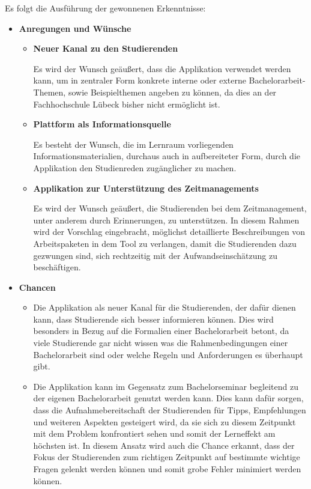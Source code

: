 \documentclass{scrreprt}
\begin{document}
\par Es folgt die Ausführung der gewonnenen Erkenntnisse:
\begin{itemize}
\item \textbf{Anregungen und Wünsche}
\begin{itemize}
\item \textbf{Neuer Kanal zu den Studierenden}
\par Es wird der Wunsch geäußert, dass die Applikation verwendet werden kann, um in zentraler Form konkrete interne oder externe Bachelorarbeit-Themen, sowie Beispielthemen angeben zu können, da dies an der Fachhochschule Lübeck bisher nicht ermöglicht ist.
\item \textbf{Plattform als Informationsquelle}
\par Es besteht der Wunsch, die im Lernraum vorliegenden Informationsmaterialien, durchaus auch in aufbereiteter Form, durch die Applikation den Studienreden zugänglicher zu machen.
\item \textbf{Applikation zur Unterstützung des Zeitmanagements}
\par Es wird der Wunsch geäußert, die Studierenden bei dem Zeitmanagement, unter anderem durch Erinnerungen, zu unterstützen. In diesem Rahmen wird der Vorschlag eingebracht, möglichst detaillierte Beschreibungen von Arbeitspaketen in dem Tool zu verlangen, damit die Studierenden dazu gezwungen sind, sich rechtzeitig mit der Aufwandseinschätzung zu beschäftigen.
\end{itemize}
\item \textbf{Chancen}
\begin{itemize}
\item Die Applikation als neuer Kanal für die Studierenden, der dafür dienen kann, dass Studierende sich besser informieren können. Dies wird besonders in Bezug auf die Formalien einer Bachelorarbeit betont, da viele Studierende gar nicht wissen was die Rahmenbedingungen einer Bachelorarbeit sind oder welche Regeln und Anforderungen es überhaupt gibt.
\item Die Applikation kann im Gegensatz zum Bachelorseminar begleitend zu der eigenen Bachelorarbeit genutzt werden kann. Dies kann dafür sorgen, dass die Aufnahmebereitschaft der Studierenden für Tipps, Empfehlungen und weiteren Aspekten gesteigert wird, da sie sich zu diesem Zeitpunkt mit dem Problem konfrontiert sehen und somit der Lerneffekt am höchsten ist. In diesem Ansatz wird auch die Chance erkannt, dass der Fokus der Studierenden zum richtigen Zeitpunkt auf bestimmte wichtige Fragen gelenkt werden können und somit grobe Fehler minimiert werden können.

\end{itemize}
\end{itemize}
\end{document}
